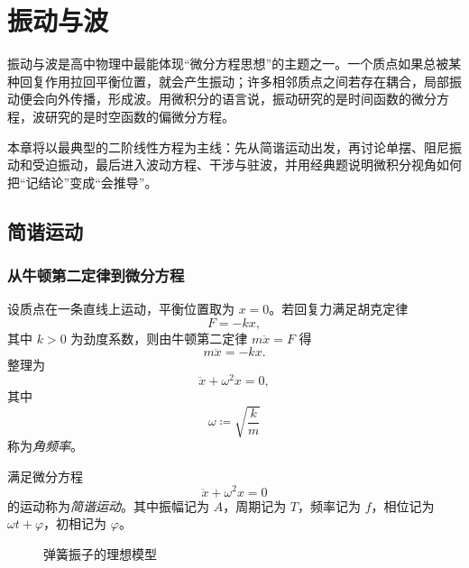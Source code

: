 \chapter{振动与波}
\label{chap:oscillations-waves}

振动与波是高中物理中最能体现“微分方程思想”的主题之一。一个质点如果总被某种回复作用拉回平衡位置，就会产生振动；许多相邻质点之间若存在耦合，局部振动便会向外传播，形成波。用微积分的语言说，振动研究的是时间函数的微分方程，波研究的是时空函数的偏微分方程。

本章将以最典型的二阶线性方程为主线：先从简谐运动出发，再讨论单摆、阻尼振动和受迫振动，最后进入波动方程、干涉与驻波，并用经典题说明微积分视角如何把“记结论”变成“会推导”。

\section{简谐运动}

\subsection{从牛顿第二定律到微分方程}

设质点在一条直线上运动，平衡位置取为 $x=0$。若回复力满足胡克定律
\[
F=-kx,
\]
其中 $k>0$ 为劲度系数，则由牛顿第二定律 $m\ddot x=F$ 得
\[
 m\ddot x=-kx.
\]
整理为
\begin{equation}
\ddot x+\omega^2 x=0,
\label{eq:sho-ode}
\end{equation}
其中
\[
\omega\coloneqq \sqrt{\frac{k}{m}}
\]
称为\emph{角频率}。

\begin{definition}
满足微分方程
\[
\ddot x+\omega^2x=0
\]
的运动称为\emph{简谐运动}。其中振幅记为 $A$，周期记为 $T$，频率记为 $f$，相位记为 $\omega t+\varphi$，初相记为 $\varphi$。
\end{definition}

\begin{figure}[H]
\centering
{}
\caption{弹簧振子的理想模型}
\end{figure}

